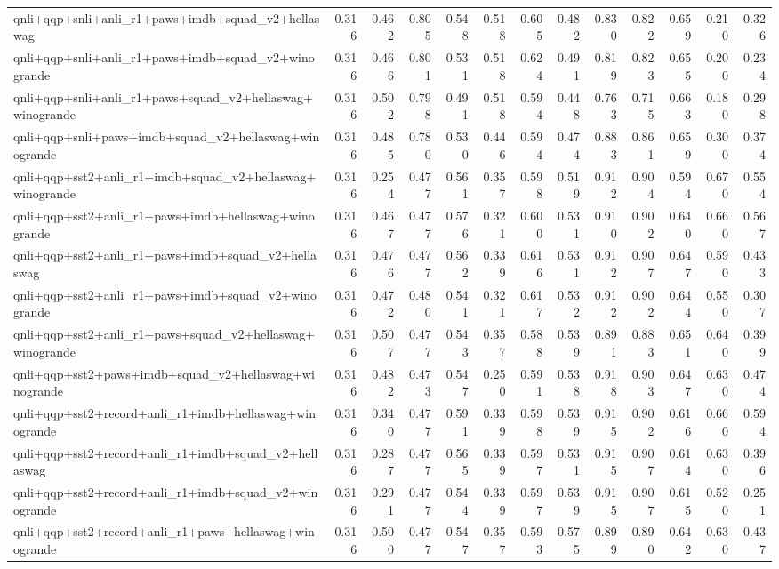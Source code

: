\begin{table}[t]
\begin{tabular}{lrrrrrrrrrrrr}
    qnli+qqp+snli+anli\_r1+paws+imdb+squad\_v2+hellaswag & 0.316 & 0.462 & 0.805 & 0.548 & 0.518 & 0.605 & 0.482 & 0.830 & 0.822 & 0.659 & 0.210 & 0.326 \\
    qnli+qqp+snli+anli\_r1+paws+imdb+squad\_v2+winogrande & 0.316 & 0.466 & 0.801 & 0.531 & 0.518 & 0.624 & 0.491 & 0.819 & 0.823 & 0.655 & 0.200 & 0.234 \\
    qnli+qqp+snli+anli\_r1+paws+squad\_v2+hellaswag+winogrande & 0.316 & 0.502 & 0.798 & 0.491 & 0.518 & 0.594 & 0.448 & 0.763 & 0.715 & 0.663 & 0.180 & 0.298 \\
    qnli+qqp+snli+paws+imdb+squad\_v2+hellaswag+winogrande & 0.316 & 0.485 & 0.780 & 0.530 & 0.446 & 0.594 & 0.474 & 0.883 & 0.861 & 0.659 & 0.300 & 0.374 \\
    qnli+qqp+sst2+anli\_r1+imdb+squad\_v2+hellaswag+winogrande & 0.316 & 0.254 & 0.477 & 0.561 & 0.357 & 0.598 & 0.519 & 0.912 & 0.904 & 0.594 & 0.670 & 0.554 \\
    qnli+qqp+sst2+anli\_r1+paws+imdb+hellaswag+winogrande & 0.316 & 0.467 & 0.477 & 0.576 & 0.321 & 0.600 & 0.531 & 0.910 & 0.902 & 0.640 & 0.660 & 0.567 \\
    qnli+qqp+sst2+anli\_r1+paws+imdb+squad\_v2+hellaswag & 0.316 & 0.476 & 0.477 & 0.562 & 0.339 & 0.616 & 0.531 & 0.912 & 0.907 & 0.647 & 0.590 & 0.433 \\
    qnli+qqp+sst2+anli\_r1+paws+imdb+squad\_v2+winogrande & 0.316 & 0.472 & 0.480 & 0.541 & 0.321 & 0.617 & 0.532 & 0.912 & 0.902 & 0.644 & 0.550 & 0.307 \\
    qnli+qqp+sst2+anli\_r1+paws+squad\_v2+hellaswag+winogrande & 0.316 & 0.507 & 0.477 & 0.543 & 0.357 & 0.588 & 0.539 & 0.891 & 0.883 & 0.651 & 0.640 & 0.399 \\
    qnli+qqp+sst2+paws+imdb+squad\_v2+hellaswag+winogrande & 0.316 & 0.482 & 0.473 & 0.547 & 0.250 & 0.591 & 0.538 & 0.918 & 0.903 & 0.647 & 0.630 & 0.474 \\
    qnli+qqp+sst2+record+anli\_r1+imdb+hellaswag+winogrande & 0.316 & 0.340 & 0.477 & 0.591 & 0.339 & 0.598 & 0.539 & 0.915 & 0.902 & 0.616 & 0.660 & 0.594 \\
    qnli+qqp+sst2+record+anli\_r1+imdb+squad\_v2+hellaswag & 0.316 & 0.287 & 0.477 & 0.565 & 0.339 & 0.597 & 0.531 & 0.915 & 0.907 & 0.614 & 0.630 & 0.396 \\
    qnli+qqp+sst2+record+anli\_r1+imdb+squad\_v2+winogrande & 0.316 & 0.291 & 0.477 & 0.544 & 0.339 & 0.597 & 0.539 & 0.915 & 0.907 & 0.615 & 0.520 & 0.251 \\
    qnli+qqp+sst2+record+anli\_r1+paws+hellaswag+winogrande & 0.316 & 0.500 & 0.477 & 0.547 & 0.357 & 0.593 & 0.575 & 0.899 & 0.890 & 0.642 & 0.630 & 0.437 \\

\end{tabular}
\end{table}
